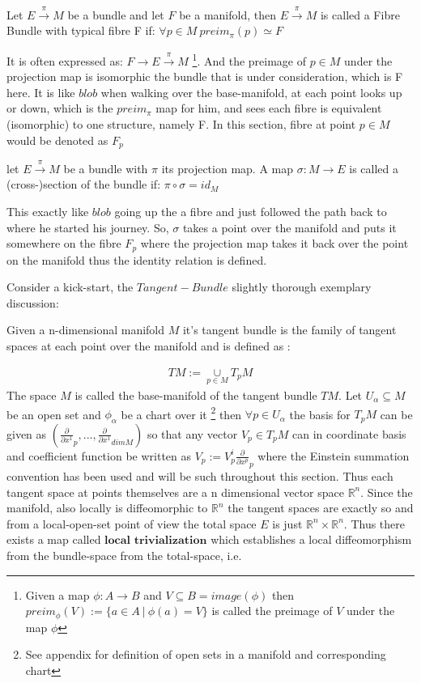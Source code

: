 \documentclass[8pt, twocoloumn]{article}
\begin{document}
\begin{theorem}
Let $E \overset{\pi}{\to} M$ be a bundle and let $F$ be a manifold, then $E \overset{\pi}{\to} M$ is called a Fibre Bundle with typical fibre F if: 
$ \forall p \in M \ preim_{\pi}(p) \simeq F$

\end{theorem}

It is often expressed as: $F \to E \overset{\pi}{\to}M$ \footnote{Given a map $\phi: A\to B$ and $V \subseteq B = image(\phi)$ then $preim_{\phi}(V) := \{a \in A \ | \  \phi(a)=V\}$ is called the preimage of $V$ under the map $\phi$}. And the preimage of $p \in M$ under the projection map is isomorphic the bundle that is under consideration, which is F here. It is like $blob$ when walking over the base-manifold, at each point looks up or down, which is the $preim_{\pi}$ map for him, and sees each fibre is equivalent (isomorphic) to one structure, namely F. In this section, fibre at point $p \in M$ would be denoted as $F_p$


\begin{theorem} {\label{section}}
let $E \overset{\pi}{\to} M$ be a bundle with $\pi$ its projection map. A map $\sigma : M \to E$ is called a (cross-)section of the bundle if: $ \pi \circ \sigma = id_{M}$
\end{theorem}

This exactly like $blob$ going up the a fibre and just followed the path back to where he started his journey. So, $\sigma$ takes a point over the manifold and puts it somewhere on the fibre $F_p$ where the projection map takes it back over the point on the manifold thus the identity relation is defined. 

Consider a kick-start, the $Tangent-Bundle$ slightly thorough exemplary discussion:

Given a n-dimensional manifold $M$ it's tangent bundle is the family of tangent spaces at each point over the manifold and is defined as :

\begin{align}
TM := \underset{p\in M}{\cup} T_p M
\end{align}
The space $M$ is called the base-manifold of the tangent bundle $TM$.
Let $U_{\alpha} \subseteq M$ be an open set and $\phi_{\alpha}$ be a chart over it \footnote{See appendix for definition of open sets in a manifold and corresponding chart} then $\forall p \in U_{\alpha}$ the basis for $T_pM$ can be given as $(\frac{\partial }{\partial x ^1}_p, . . . ,\frac{\partial }{\partial x ^1}_{dim M}  )$ so that any vector $V_p \in T_p M$ can in coordinate basis and coefficient function be written as $V_p := V_{p}^i\frac{\partial }{\partial x ^p}_p$ where the Einstein summation convention has been used and will be such throughout this section.
Thus each tangent space at points themselves are a n dimensional vector space $\mathbb{R}^n$. Since the manifold, also locally is diffeomorphic to $\mathbb{R}^n$ the tangent spaces are exactly so and from a local-open-set point of view the total space $E$ is just $\mathbb{R}^n \times \mathbb{R}^n$. Thus there exists a map called $\textbf{local trivialization}$ which establishes a local diffeomorphism from the bundle-space from the total-space, i.e.
\end{document}
